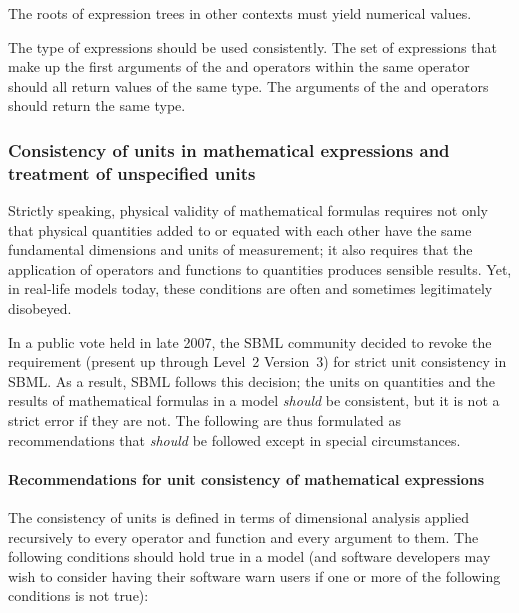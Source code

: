 The roots of expression trees in other contexts must yield
numerical values.

The type of expressions should be used consistently.  The set of
expressions that make up the first arguments of the 
and  operators within the same 
operator should all return values of the same type. The arguments
of the  and  operators should return the same
type.


\subsubsection{Consistency of units in mathematical expressions
  and treatment of unspecified units}
\label{sec:operator-arg-types}

Strictly speaking, physical validity of mathematical formulas
requires not only that physical quantities added to or equated
with each other have the same fundamental dimensions and units of
measurement; it also requires that the application of operators
and functions to quantities produces sensible results.  Yet, in
real-life models today, these conditions are often and sometimes
legitimately disobeyed.

In a public vote held in late 2007, the SBML community decided to
revoke the requirement (present up through Level~2 Version~3) for
strict unit consistency in SBML.  As a result, SBML \thisL
follows this decision; the units on quantities and the results
of mathematical formulas in a model \emph{should} be consistent,
but it is not a strict error if they are not.  The following are
thus formulated as recommendations that \emph{should} be followed
except in special circumstances.


\paragraph{Recommendations for unit consistency of mathematical expressions}

The consistency of units is defined in terms of dimensional
analysis applied recursively to every operator and function and
every argument to them.  The following conditions should hold true
in a model (and software developers may wish to consider having
their software warn users if one or more of the following
conditions is not true):


